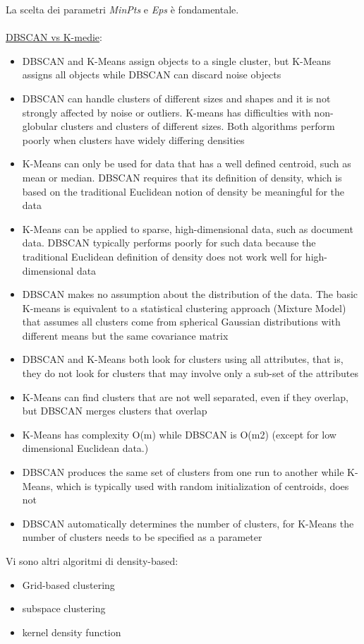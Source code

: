 La scelta dei parametri \textit{MinPts} e \textit{Eps} \`e fondamentale.
\\
\\
\underline{DBSCAN vs K-medie}:
\begin{itemize}
	\item DBSCAN and K-Means assign objects to a single cluster, but K-Means assigns all
	objects while DBSCAN can discard noise objects
	\item DBSCAN can handle clusters of different sizes and shapes and it is not strongly
	affected by noise or outliers. K-means has difficulties with non-globular clusters and
	clusters of different sizes. Both algorithms perform poorly when clusters have widely
	differing densities
	\item K-Means can only be used for data that has a well defined centroid, such as mean or
	median. DBSCAN requires that its definition of density, which is based on the
	traditional Euclidean notion of density be meaningful for the data
	\item K-Means can be applied to sparse, high-dimensional data, such as document data.
	DBSCAN typically performs poorly for such data because the traditional Euclidean
	definition of density does not work well for high-dimensional data
	\item DBSCAN makes no assumption about the distribution of the data. The basic K-means
	is equivalent to a statistical clustering approach (Mixture Model) that assumes all
	clusters come from spherical Gaussian distributions with different means but the
	same covariance matrix
	\item DBSCAN and K-Means both look for clusters using all attributes, that is, they do not
	look for clusters that may involve only a sub-set of the attributes
	\item K-Means can find clusters that are not well separated, even if they overlap, but
	DBSCAN merges clusters that overlap
	\item K-Means has complexity O(m) while DBSCAN is O(m2) (except for low dimensional
	Euclidean data.)
	\item DBSCAN produces the same set of clusters from one run to another while K-Means,
	which is typically used with random initialization of centroids, does not
	\item DBSCAN automatically determines the number of clusters, for K-Means the number
	of clusters needs to be specified as a parameter
\end{itemize}
\noindent
Vi sono altri algoritmi di density-based:
\begin{itemize}
	\item Grid-based clustering
	\item subspace clustering
	\item kernel density function
\end{itemize}

